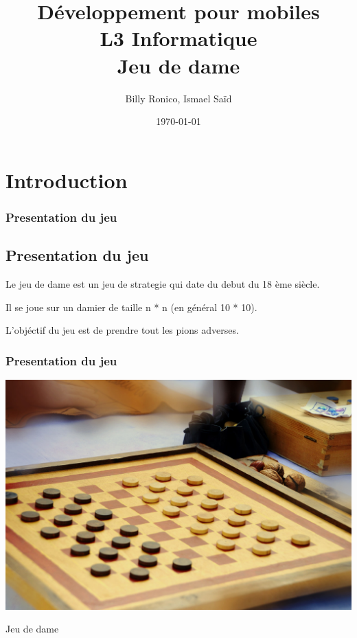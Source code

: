 \documentclass{beamer}
\title[Dev. Mobiles -- L3 info]{Développement pour mobiles\\L3 Informatique\\\textbf{Jeu de dame}}
\author{Billy Ronico, Ismael Saïd}
\institute[DI]{Université de la Réunin}
\date{\today}
\begin{document}
\begin{frame}
  \titlepage
\end{frame}


\section{Introduction}
%
%
\begin{frame}
  \frametitle{Presentation du jeu}
    \subsection{Presentation du jeu}
    Le jeu de dame est un jeu de strategie qui date du debut du 18 ème siècle. 
    
    Il se joue sur un damier de taille n * n (en général 10 * 10).

    L'objéctif du jeu est de prendre tout les pions adverses.

\end{frame}
%
%
\begin{frame}
  \frametitle{Presentation du jeu}

  \begin{center}
    \includegraphics[scale=0.5]{img_dame.jpg}
  \end{center}
  
  \begin{center}
    Jeu de dame
  \end{center}

\end{frame}
\end{document}
